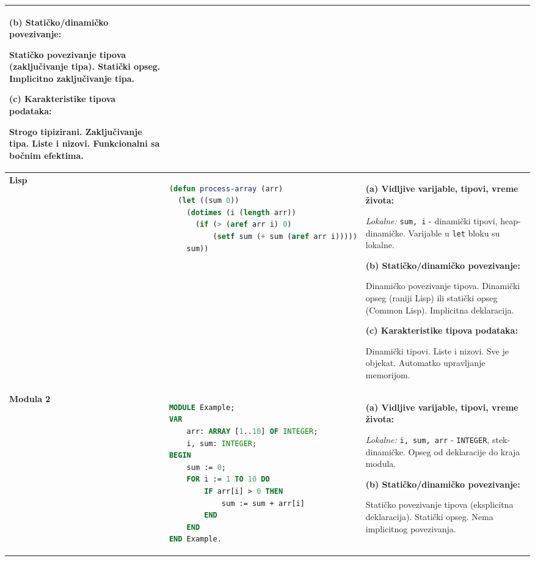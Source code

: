 \documentclass[12pt,a4paper]{article}
\begin{document}
\begin{longtable}{|p{2cm}|p{5cm}|p{8cm}|}
\vspace{0.2cm}
\textbf{(b) Statičko/dinamičko povezivanje:}

Statičko povezivanje tipova (zaključivanje tipa). Statički opseg. Implicitno zaključivanje tipa.

\vspace{0.2cm}
\textbf{(c) Karakteristike tipova podataka:}

Strogo tipizirani. Zaključivanje tipa. Liste i nizovi. Funkcionalni sa bočnim efektima. \\
\hline

\textbf{Lisp} & 
\begin{lstlisting}[language=Lisp]
(defun process-array (arr)
  (let ((sum 0))
    (dotimes (i (length arr))
      (if (> (aref arr i) 0)
          (setf sum (+ sum (aref arr i)))))
    sum))
\end{lstlisting} & 
\textbf{(a) Vidljive varijable, tipovi, vreme života:}

\textit{Lokalne:} \texttt{sum, i} - dinamički tipovi, heap-dinamičke. Varijable u \texttt{let} bloku su lokalne.

\vspace{0.2cm}
\textbf{(b) Statičko/dinamičko povezivanje:}

Dinamičko povezivanje tipova. Dinamički opseg (raniji Lisp) ili statički opseg (Common Lisp). Implicitna deklaracija.

\vspace{0.2cm}
\textbf{(c) Karakteristike tipova podataka:}

Dinamički tipovi. Liste i nizovi. Sve je objekat. Automatko upravljanje memorijom. \\
\hline

\textbf{Modula 2} & 
\begin{lstlisting}[language=Modula2]
MODULE Example;
VAR
    arr: ARRAY [1..10] OF INTEGER;
    i, sum: INTEGER;
BEGIN
    sum := 0;
    FOR i := 1 TO 10 DO
        IF arr[i] > 0 THEN
            sum := sum + arr[i]
        END
    END
END Example.
\end{lstlisting} & 
\textbf{(a) Vidljive varijable, tipovi, vreme života:}

\textit{Lokalne:} \texttt{i, sum, arr} - \texttt{INTEGER}, stek-dinamičke. Opseg od deklaracije do kraja modula.

\vspace{0.2cm}
\textbf{(b) Statičko/dinamičko povezivanje:}

Statičko povezivanje tipova (eksplicitna deklaracija). Statički opseg. Nema implicitnog povezivanja.


\end{longtable}
\end{document}

